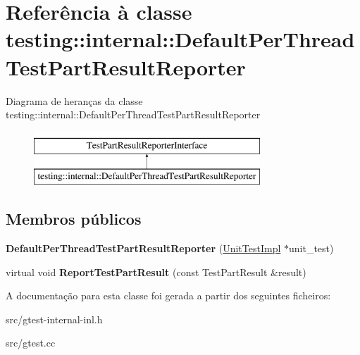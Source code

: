 \hypertarget{classtesting_1_1internal_1_1DefaultPerThreadTestPartResultReporter}{\section{Referência à classe testing\-:\-:internal\-:\-:Default\-Per\-Thread\-Test\-Part\-Result\-Reporter}
\label{classtesting_1_1internal_1_1DefaultPerThreadTestPartResultReporter}
}
Diagrama de heranças da classe testing\-:\-:internal\-:\-:Default\-Per\-Thread\-Test\-Part\-Result\-Reporter\begin{figure}[H]
\begin{center}
\leavevmode
\includegraphics[height=2.000000cm]{classtesting_1_1internal_1_1DefaultPerThreadTestPartResultReporter}
\end{center}
\end{figure}
\subsection*{Membros públicos}
\begin{DoxyCompactItemize}
\item 
\hypertarget{classtesting_1_1internal_1_1DefaultPerThreadTestPartResultReporter_a968a846e5a90d2ffea8b2ce2746099bd}{{\bfseries Default\-Per\-Thread\-Test\-Part\-Result\-Reporter} (\hyperlink{classtesting_1_1internal_1_1UnitTestImpl}{Unit\-Test\-Impl} $\ast$unit\-\_\-test)}\label{classtesting_1_1internal_1_1DefaultPerThreadTestPartResultReporter_a968a846e5a90d2ffea8b2ce2746099bd}

\item 
\hypertarget{classtesting_1_1internal_1_1DefaultPerThreadTestPartResultReporter_ac6dc08eadc4e5a2a64a91d0b6c6b3aad}{virtual void {\bfseries Report\-Test\-Part\-Result} (const Test\-Part\-Result \&result)}\label{classtesting_1_1internal_1_1DefaultPerThreadTestPartResultReporter_ac6dc08eadc4e5a2a64a91d0b6c6b3aad}

\end{DoxyCompactItemize}


A documentação para esta classe foi gerada a partir dos seguintes ficheiros\-:\begin{DoxyCompactItemize}
\item 
src/gtest-\/internal-\/inl.\-h\item 
src/gtest.\-cc\end{DoxyCompactItemize}
